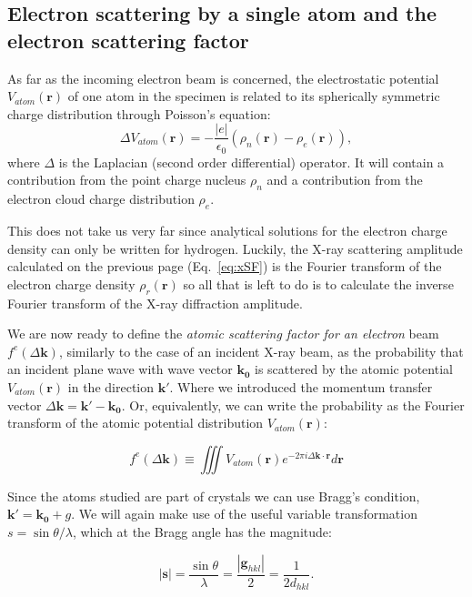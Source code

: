 %
\subsection{Electron scattering by a single atom and the electron scattering factor}

As far as the incoming electron beam is concerned, the electrostatic potential $V_{atom}(\mathbf{r})$ of one atom in the specimen is related to its spherically symmetric charge distribution through Poisson's equation:
\begin{equation}
\Delta V_{atom}(\mathbf{r})= - \frac{|e|}{\epsilon_0}\left(\rho _n(\mathbf{r}) - \rho_e(\mathbf{r})\right),
\label{eq:Poisson}
\end{equation}
where $\Delta$ is the Laplacian (second order differential) operator. It will contain a contribution from the point charge nucleus $\rho_n$ and a contribution from the electron cloud charge distribution $\rho_e$.

This does not take us very far since analytical solutions for the electron charge density can only be written for hydrogen. Luckily, the X-ray scattering amplitude calculated on the previous page (Eq.~\ref{eq:xSF}) is the Fourier transform of the electron charge density $\rho_r(\mathbf{r})$ so all that is left to do is to calculate the inverse Fourier transform of the X-ray diffraction amplitude.

We are now ready to define the \textit{atomic scattering factor for an electron} beam $f^e(\Delta \mathbf{k})$, similarly to the case of an incident X-ray beam, as the probability that an incident plane wave with wave vector $\mathbf{k_0}$ is scattered by the atomic potential $V_{atom}(\mathbf{r})$ in the direction $\mathbf{k'}$. Where we introduced the momentum transfer vector $\Delta \mathbf{k}=\mathbf{k'}-\mathbf{k_0}$. Or, equivalently, we can write the probability as the Fourier transform of the atomic potential distribution $V_{atom}(\mathbf{r})$:

\begin{equation}
f^e(\Delta \mathbf{k}) \equiv \iiint V_{atom}(\mathbf{r})e^{-2\pi i \Delta \mathbf{k} \cdot \mathbf{r}} d\mathbf{r}
\end{equation}

Since the atoms studied are part of crystals we can use Bragg's condition, $\mathbf{k'} = \mathbf{k_0}+g$. We will again make use of the useful variable transformation $s = \sin{\theta}/\lambda$, which at the Bragg angle has the magnitude:

\begin{equation}
|\mathbf{s}| = \frac{\sin{\theta}}{\lambda}=\frac{|\mathbf{g}_{hkl}|}{2}=\frac{1}{2 d_{hkl}}.
\label{eq:s}
\end{equation}

